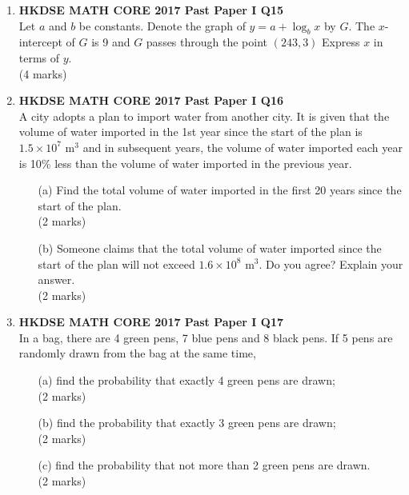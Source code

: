 \documentclass[12pt]{article}
\begin{document}
\begin{enumerate}
	\item \textbf{HKDSE MATH CORE 2017 Past Paper I Q15}\\
	Let $a$ and $b$ be constants. Denote the graph of $y = a + \log_b{x}$ by $G$. The $x$-intercept of $G$ is 9 and $G$ passes through the point $(243, 3)$ Express $x$ in terms of $y$. \\(4 marks)

	\item \textbf{HKDSE MATH CORE 2017 Past Paper I Q16}\\
	A city adopts a plan to import water from another city. It is given that the volume of water imported in the 1st year since the start of the plan is $1.5 \times 10^7$ m$^3$ and in subsequent years, the volume of water imported each year is 10\% less than the volume of water imported in the previous year.
	\begin{enumerate}
		\item[(a)] Find the total volume of water imported in the first 20 years since the start of the plan. \\(2 marks) 
		\item[(b)] Someone claims that the total volume of water imported since the start of the plan will not exceed $1.6 \times 10^8$ m$^3$. Do you agree? Explain your answer. \\(2 marks)
	\end{enumerate}

	\item \textbf{HKDSE MATH CORE 2017 Past Paper I Q17}\\
	In a bag, there are 4 green pens, 7 blue pens and 8 black pens. If 5 pens are randomly drawn from the bag at the same time,
	\begin{enumerate}
		\item[(a)] find the probability that exactly 4 green pens are drawn; \\(2 marks)
		\item[(b)] find the probability that exactly 3 green pens are drawn; \\(2 marks)
		\item[(c)] find the probability that not more than 2 green pens are drawn. \\(2 marks)
	\end{enumerate}


\end{enumerate}
\end{document}
